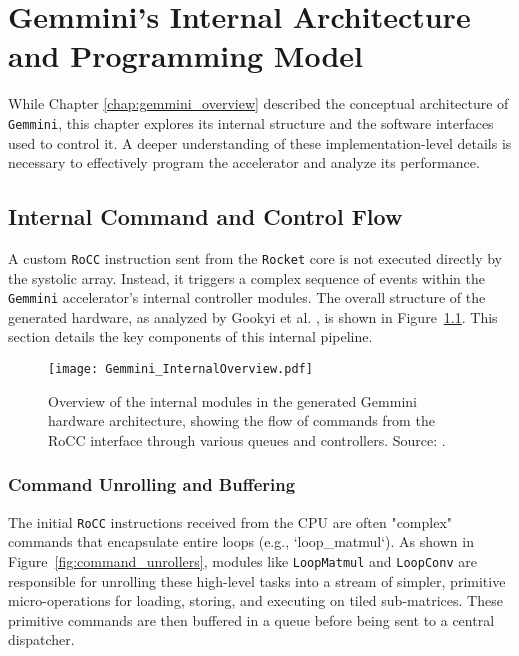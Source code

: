 \chapter{Gemmini's Internal Architecture and Programming Model}
\label{chap:gemmini_internals}

While Chapter \ref{chap:gemmini_overview} described the conceptual architecture of \texttt{Gemmini}, this chapter explores its internal structure and the software interfaces used to control it. A deeper understanding of these implementation-level details is necessary to effectively program the accelerator and analyze its performance.

\section{Internal Command and Control Flow}
\label{sec:gemmini_internal_flow}

A custom \texttt{RoCC} instruction sent from the \texttt{Rocket} core is not executed directly by the systolic array. Instead, it triggers a complex sequence of events within the \texttt{Gemmini} accelerator's internal controller modules. The overall structure of the generated hardware, as analyzed by Gookyi et al. \cite{gookyi2023gemmini_case_study}, is shown in Figure~\ref{fig:gemmini_internal_modules}. This section details the key components of this internal pipeline.

\begin{figure}[htbp]
    \centering
    \texttt{[image: Gemmini\_InternalOverview.pdf]}
    \caption{Overview of the internal modules in the generated Gemmini hardware architecture, showing the flow of commands from the RoCC interface through various queues and controllers. Source: \cite{gookyi2023gemmini_case_study}.}
    \label{fig:gemmini_internal_modules}
\end{figure}

\subsection{Command Unrolling and Buffering}
The initial \texttt{RoCC} instructions received from the CPU are often "complex" commands that encapsulate entire loops (e.g., `loop_matmul`). As shown in Figure~\ref{fig:command_unrollers}, modules like \texttt{LoopMatmul} and \texttt{LoopConv} are responsible for unrolling these high-level tasks into a stream of simpler, primitive micro-operations for loading, storing, and executing on tiled sub-matrices. These primitive commands are then buffered in a queue before being sent to a central dispatcher.

